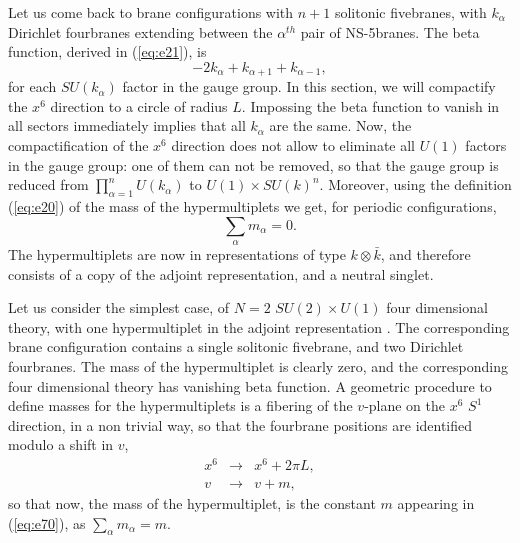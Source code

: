 Let us come back to brane configurations with $n+1$ solitonic fivebranes, with 
$k_{\alpha}$ Dirichlet fourbranes extending between the $\alpha^{th}$ pair 
of NS-5branes. The beta function, derived in (\ref{eq:e21}), is
\begin{equation}
-2k_{\alpha}+k_{\alpha+1}+k_{\alpha-1},
\label{eq:e68}
\end{equation}
for each $SU(k_{\alpha})$ factor in the gauge group. In this section, we 
will compactify the $x^6$ direction to a circle of radius $L$. Impossing the 
beta function to vanish in all sectors immediately implies that all $k_{\alpha}$ 
are the same. Now, the compactification of the $x^6$ direction does 
not allow to eliminate all $U(1)$ factors in the gauge group: one of them 
can not be removed, so that the gauge group is reduced from $\prod_{\alpha=1}^n 
U(k_{\alpha})$ to $U(1) \times SU(k)^n$. Moreover, using the definition 
(\ref{eq:e20}) of the mass of the hypermultiplets we get, for periodic 
configurations, 
\begin{equation}
\sum_{\alpha} m_{\alpha} = 0.
\label{eq:e69}
\end{equation}
The hypermultiplets are now in representations of type $k \otimes \bar{k}$, and 
therefore consists of a copy of the adjoint representation, and a neutral singlet.
  
Let us consider the simplest case, of $N=2$ $SU(2) \times U(1)$ four dimensional theory, 
with one hypermultiplet in the adjoint representation \cite{Wm4}. The corresponding brane 
configuration contains a single solitonic fivebrane, and two Dirichlet 
fourbranes. The mass of the hypermultiplet is clearly zero, and the corresponding 
four dimensional theory has vanishing beta function. A geometric procedure 
to define masses for the hypermultiplets is a fibering of the $v$-plane on the 
$x^6$ $S^1$ direction, in a non trivial way, so that the fourbrane positions are 
identified modulo a shift in $v$,
\begin{eqnarray}
x^6 & \rightarrow & x^6 + 2 \pi L, \nonumber \\
v   & \rightarrow & v + m,
\label{eq:e70}
\end{eqnarray}
so that now, the mass of the hypermultiplet, is the constant $m$ appearing in   
(\ref{eq:e70}), as $\sum_{\alpha} m_{\alpha} = m$.
  
